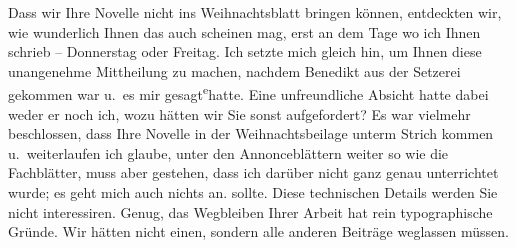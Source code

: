 \pstart
           Dass wir Ihre Novelle nicht
               ins Weihnachtsblatt bringen
               können, entdeckten wir, wie wunderlich Ihnen das auch scheinen mag, erst an dem Tage
               wo ich Ihnen schrieb – Donnerstag oder Freitag. Ich setzte
               mich gleich hin, um Ihnen diese unangenehme Mittheilung zu machen, nachdem Benedikt aus der Setzerei gekommen war u. es
               mir \introOben{}ge\introOben{}sagt\substVorne{}\textsuperscript{e}\substDazwischen{}{ }hatte\substHinten{}. Eine unfreundliche Absicht hatte dabei weder er noch ich, wozu
               hätten wir Sie sonst aufgefordert? Es war vielmehr beschlossen, dass Ihre Novelle in der Weihnachtsbeilage unterm Strich kommen u. weiterlaufen \introOben{}ich glaube, unter den Annonceblättern weiter so wie die
                  Fachblätter, muss aber gestehen, dass ich darüber nicht ganz genau unterrichtet
                  wurde; es geht mich auch nichts an.\introOben{} sollte. Diese technischen {\pb}Details werden Sie nicht interessiren.
               Genug, das Wegbleiben Ihrer Arbeit hat rein typographische Gründe. Wir hätten nicht einen, sondern alle
               anderen Beiträge weglassen müssen.\pend
           
